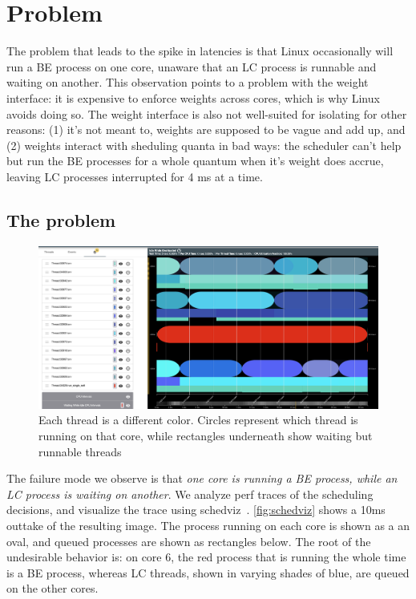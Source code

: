 \section{Problem}\label{s:problem}

The problem that leads to the spike in latencies is that Linux occasionally will
run a BE process on one core, unaware that an LC process is runnable and waiting
on another. This observation points to a problem with the \cgroups{} weight
interface: it is expensive to enforce weights across cores, which is why Linux
avoids doing so. The \cgroups{} weight interface is also not well-suited for
isolating for other reasons: (1) it's not meant to, weights are supposed to be
vague and add up, and (2) weights interact with sheduling quanta in bad ways:
the scheduler can't help but run the BE processes for a whole quantum when it's
weight does accrue, leaving LC processes interrupted for 4 ms at a
time.

\subsection{The problem}

\begin{figure}[t]
    \centering
    \includegraphics[width=\columnwidth]{graphs/schedviz.png}
    \caption{Each thread is a different color. Circles represent which
    thread is running on that core, while rectangles underneath show waiting but
    runnable threads
    }\label{fig:schedviz}
\end{figure}

The failure mode we observe is that \textit{one core is running a BE process,
while an LC process is waiting on another}. We analyze perf traces of the
scheduling decisions, and visualize the trace using schedviz~\cite{TODO}.
\autoref{fig:schedviz} shows a 10ms outtake of the resulting image. The process
running on each core is shown as a an oval, and queued processes are shown as
rectangles below. The root of the undesirable behavior is: on core 6, the red
process that is running the whole time is a BE process, whereas LC threads,
shown in varying shades of blue, are queued on the other cores.

